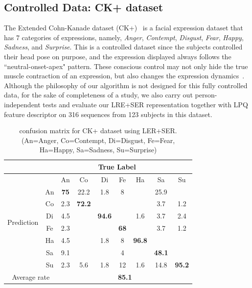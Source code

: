 \documentclass[journal]{IEEEtran}
\begin{document}
\subsection{Controlled Data: CK+ dataset}

The Extended Cohn-Kanade dataset (CK+)~\cite{CKplus} is a facial expression dataset that has 7 categories of expressions, namely, \textit{Anger}, \textit{Contempt}, \textit{Disgust}, \textit{Fear}, \textit{Happy}, \textit{Sadness}, and \textit{Surprise}. This is a controlled dataset since the subjects controlled their head pose on purpose, and the expression displayed always follows the ``neutral-onset-apex" pattern. These conscious control may not only hide the true muscle contraction of an expression, but also changes the expression dynamics~\cite{Bartlett03}\cite{Ekman2005}. Although the philosophy of our algorithm is not designed for this fully controlled data, for the sake of completeness of a study, we also carry out person-independent tests and evaluate our LRE+SER representation together with LPQ feature descriptor on 316 sequences from 123 subjects in this dataset.

\begin{table}[htbp]
\caption{confusion matrix for CK+ dataset using LER+SER.
(An=Anger, Co=Contempt, Di=Disgust, Fe=Fear, Ha=Happy, Sa=Sadness, Su=Surprise)}
\begin{center}
\label{table:CK_result}
\begin{tabular}{c|c|ccccccc}

&\multicolumn{8}{c}{True Label} \\ \hline
\multirow{8}{*}{\begin{sideways}Prediction\end{sideways}} && An & Co & Di & Fe & Ha & Sa & Su \\ \cline{2-9}
&An          &\textbf{75} &22.2  &1.8  &8  &  &25.9 &  \\ \cline{2-2}
&Co       &2.3  &\textbf{72.2}  &   &   &  &3.7  &1.2 \\ \cline{2-2}
&Di        &4.5  &   &\textbf{94.6} &  &1.6 &3.7 &2.4  \\ \cline{2-2}
&Fe           &2.3   &   &   &\textbf{68} &  &3.7  &1.2  \\ \cline{2-2}
&Ha          &4.5   &   &1.8  &8 &\textbf{96.8} &  &  \\ \cline{2-2}
&Sa        &9.1  &  &  &4   &  &\textbf{48.1} & \\ \cline{2-2}
&Su       &2.3  &5.6 &1.8  &12 &1.6  &14.8 &\textbf{95.2} \\ \hline
\multicolumn{2}{c|}{Average rate} &\multicolumn{7}{c}{\textbf{85.1}} \\

\end{tabular}
\end{center}
\end{table}
\end{document}
